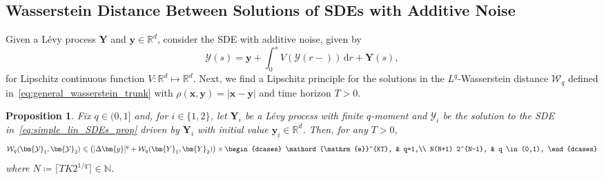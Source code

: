 \documentclass[en,oneside,bbfont,article]{amsart}
\newtheorem{proposition}[theorem]{Proposition}
\theoremstyle{remark}
\theoremstyle{definition}
\theoremstyle{definition}
\newcommand\N{\mathbb{N}}
\newcommand\Y{\bm{\mathcal{Y}}}
\newcommand{\mW}{\mathcal{W}}
\newcommand\R{\mathbb{R}}
\newcommand\e{\mathord{\mathrm{e}}}
\newcommand\1{\mathds{1}}
\renewcommand\le{\leqslant}
\newcommand{\ceil}[1]{\lceil#1\rceil}
\begin{document}
\subsection{Wasserstein Distance Between Solutions of SDEs with Additive Noise}
\label{subsec:additive-SDE}
Given a L\'evy process $\bm{Y}$ and $\bm{y} \in \R^d$, consider the SDE with additive noise, given by 
\begin{equation}
\label{eq:simple_lin_SDEs_prop}
\Y(s) = \bm{y} + \int_0^s V(\Y(r-)) \, \mathrm{d}r + \bm{Y}(s),
\end{equation}
for Lipschitz continuous function $V:\R^d \mapsto \R^{d}$. Next, we find a Lipschitz principle for the solutions in the $L^q$-Wasserstein distance $\mW_q$ defined in~\eqref{eq:general_wasserstein_trunk} with $\rho(\bm{x},\bm{y})=|\bm{x}-\bm{y}|$ and time horizon $T>0$.

\begin{proposition}
\label{prop:simple_lin_SDE_gen_bound} 
Fix $q \in (0,1]$ and, for $i\in\{1,2\}$, let $\bm{Y}_i$ be a L\'evy process with finite $q$-moment and $\Y_i$ be the solution to the SDE in~\eqref{eq:simple_lin_SDEs_prop} driven by $\bm{Y}_i$ with initial value $\bm{y}_i\in\R^d$. Then, for any $T>0$,
\begin{equation*}
\mW_q(\Y_1,\Y_2) 
\le \big(|\Delta\bm{y}|^q +\mW_{q}(\bm{Y}_1,\bm{Y}_2) \big)
\times\begin{dcases}
\e^{KT}, & q=1,\\
 N(N+1) 2^{N-1}, & q \in (0,1),
\end{dcases}
\end{equation*}
where $N \coloneqq \ceil{TK2^{1/q}} \in \N$.
\end{proposition}
\end{document}
